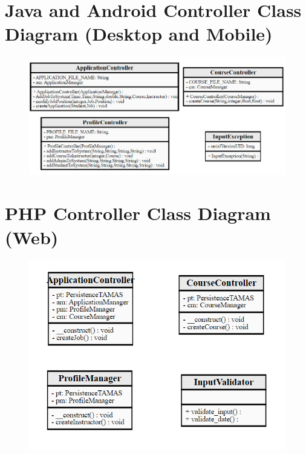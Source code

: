 \documentclass[12pt]{report}
\begin{document}
\section{Java and Android Controller Class Diagram (Desktop and Mobile)}
\begin{figure}[H]
	\centering
	\includegraphics[scale=0.95]{./Design/ClassDiagrams/ControllerPackageClassDiagramJava}
\end{figure}
\section{PHP Controller Class Diagram (Web)}
\begin{figure}[H]
	\centering
	\includegraphics[scale=1.05]{./Design/ClassDiagrams/ControllerPackageClassDiagramPHP}
\end{figure}
\end{document}

